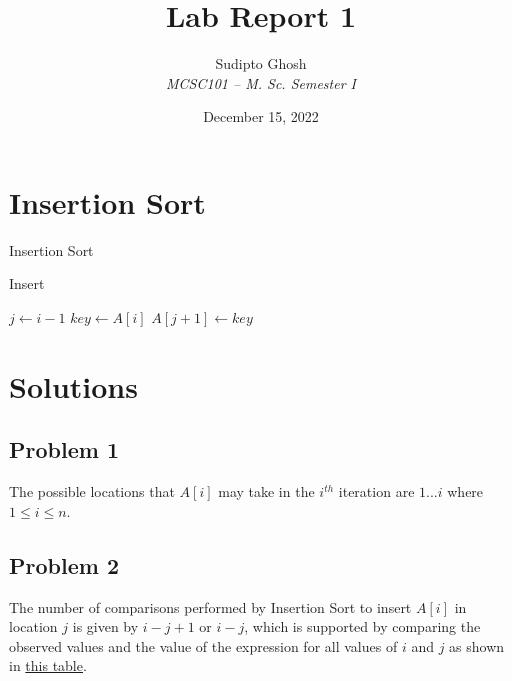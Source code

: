 \documentclass{article}
\title{Lab Report 1}
\author{Sudipto Ghosh\\\it{MCSC101 -- M. Sc. Semester I}}
\affil{Department of Computer Science\\University of Delhi}
\date{\printdayoff December 15, 2022}
\begin{document}
\maketitle

\section{Insertion Sort}
\begin{algorithm}
\caption{Insertion Sort}
\label{alg:one}
\end{algorithm}
\begin{algorithm}
\caption{Insert}
\label{alg:two}
$j \gets i - 1$\;
$key \gets A[i]$\;
$A[j + 1] \gets key$\;
\end{algorithm}
\section{Solutions}
\subsection{Problem 1}
The possible locations that $A[i]$ may take in the $i^{th}$ iteration are $1...i$ where $1 \leq i \leq n$.

\subsection{Problem 2}
The number of comparisons performed by Insertion Sort to insert $A[i]$ in location $j$ is given by $i - j + 1$ or $i - j$, which is supported by comparing the observed values and the value of the expression for all values of $i$ and $j$ as shown in \hyperref[sec:data]{this table}.
\end{document}
